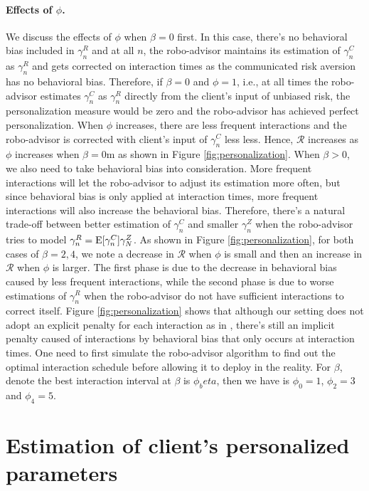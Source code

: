 \paragraph{Effects of $\phi$.} We discuss the effects of $\phi$ when $\beta=0$ first. In this case, there's no behavioral bias included in $\gamma_n^R$ and at all $n$, the robo-advisor maintains its estimation of $\gamma_n^C$ as $\gamma_n^R$ and gets corrected on interaction times as the communicated risk aversion has no behavioral bias. Therefore, if $\beta=0$ and $\phi=1$, i.e., at all times the robo-advisor estimates $\gamma_n^C$ as $\gamma_n^R$ directly from the client's input of unbiased risk, the personalization measure would be zero and the robo-advisor has achieved perfect personalization. When $\phi$ increases, there are less frequent interactions and the robo-advisor is corrected with client's input of $\gamma_n^C$ less less. Hence, $\mathcal R$ increases as $\phi$ increases when $\beta=0$m as shown in Figure \ref{fig:personalization}. When $\beta>0$, we also need to take behavioral bias into consideration. More frequent interactions will let the robo-advisor to adjust its estimation more often, but since behavioral bias is only applied at interaction times, more frequent interactions will also increase the behavioral bias. Therefore, there's a natural trade-off between better estimation of $\gamma_n^C$ and smaller $\gamma_n^Z$ when the robo-advisor tries to model $\gamma_n^R=\mathrm{E}[\gamma_n^C]\gamma_N^Z$. As shown in Figure \ref{fig:personalization}, for both cases of $\beta=2,4$, we note a decrease in $\mathcal R$ when $\phi$ is small and then an increase in $\mathcal R$ when $\phi$ is larger. The first phase is due to the decrease in behavioral bias caused by less frequent interactions, while the second phase is due to worse estimations of $\gamma_n^R$ when the robo-advisor do not have sufficient interactions to correct itself. Figure \ref{fig:personalization} shows that although our setting does not adopt an explicit penalty for each interaction as in \cite{alsabah2021robo}, there's still an implicit penalty caused of interactions by behavioral bias that only occurs at interaction times. One need to first simulate the robo-advisor algorithm to find out the optimal interaction schedule before allowing it to deploy in the reality. For $\beta$, denote the best interaction interval at $\beta$ is $\phi_beta$, then we have is $\phi_0=1$, $\phi_2=3$ and $\phi_4=5$. 

\section{Estimation of client's personalized parameters}\label{sec:est_exp}

